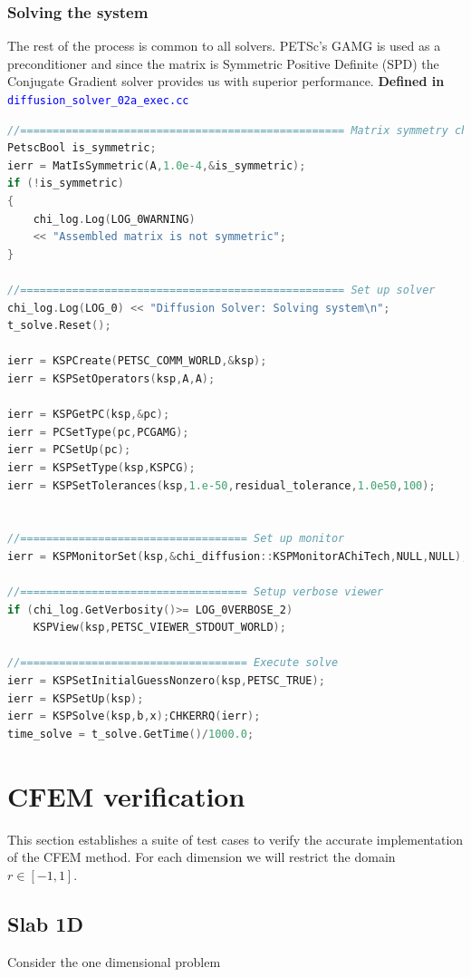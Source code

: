 \documentclass[11pt,letterpaper,titlepage]{article}
\newcommand{\xmltag}[1]{\textcolor{blue}{ \texttt{#1}} }
\numberwithin{equation}{section}
\begin{document}
\subsubsection{Solving the system}
The rest of the process is common to all solvers. PETSc's GAMG is used as a preconditioner and since the matrix is Symmetric Positive Definite (SPD) the Conjugate Gradient solver provides us with superior performance.
\newline
\newline
\textbf{Defined in }\xmltag{diffusion\_solver\_02a\_exec.cc}
\begin{lstlisting}[language=c++]
//================================================== Matrix symmetry check
PetscBool is_symmetric;
ierr = MatIsSymmetric(A,1.0e-4,&is_symmetric);
if (!is_symmetric)
{
	chi_log.Log(LOG_0WARNING)
	<< "Assembled matrix is not symmetric";
}

//================================================== Set up solver
chi_log.Log(LOG_0) << "Diffusion Solver: Solving system\n";
t_solve.Reset();

ierr = KSPCreate(PETSC_COMM_WORLD,&ksp);
ierr = KSPSetOperators(ksp,A,A);

ierr = KSPGetPC(ksp,&pc);
ierr = PCSetType(pc,PCGAMG);
ierr = PCSetUp(pc);
ierr = KSPSetType(ksp,KSPCG);
ierr = KSPSetTolerances(ksp,1.e-50,residual_tolerance,1.0e50,100);


//=================================== Set up monitor
ierr = KSPMonitorSet(ksp,&chi_diffusion::KSPMonitorAChiTech,NULL,NULL);

//=================================== Setup verbose viewer
if (chi_log.GetVerbosity()>= LOG_0VERBOSE_2)
	KSPView(ksp,PETSC_VIEWER_STDOUT_WORLD);

//=================================== Execute solve
ierr = KSPSetInitialGuessNonzero(ksp,PETSC_TRUE);
ierr = KSPSetUp(ksp);
ierr = KSPSolve(ksp,b,x);CHKERRQ(ierr);
time_solve = t_solve.GetTime()/1000.0;
\end{lstlisting}


\section{CFEM verification}
This section establishes a suite of test cases to verify the accurate implementation of the CFEM method. For each dimension we will restrict the domain $r \in [-1,1]$.

\subsection{Slab 1D}
Consider the one dimensional problem
\end{document}
